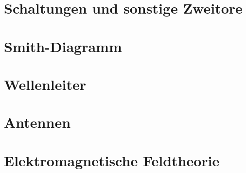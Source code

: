 \documentclass[
	DIV=calc,
	fontsize=7pt,
	paper=A4,
	pagesize,
	twocolumn
	]{scrartcl}
\begin{document}
\section*{Schaltungen und sonstige Zweitore}


\section*{Smith-Diagramm}


\section*{Wellenleiter}


\section*{Antennen}


\section*{Elektromagnetische Feldtheorie}






\end{document}
